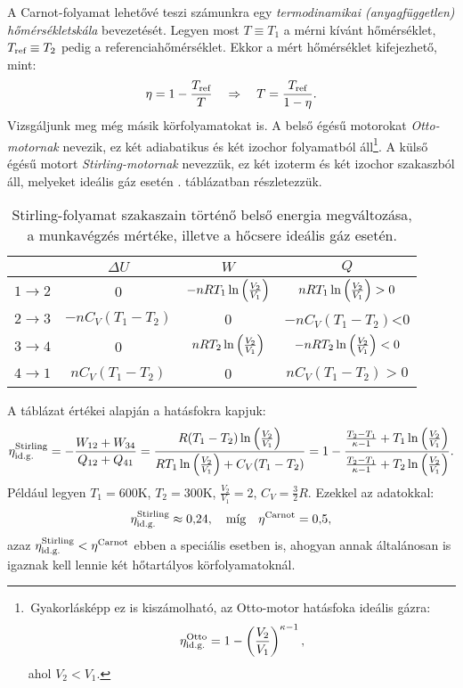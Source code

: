 A Carnot-folyamat lehetővé teszi számunkra egy \emph{termodinamikai (anyagfüggetlen) hőmérsékletskála} bevezetését. Legyen most $T\equiv T_1$ a mérni kívánt hőmérséklet, $T_{\textnormal{ref}}\equiv T_2$ pedig a referenciahőmérséklet. Ekkor a mért hőmérséklet kifejezhető, mint:
\begin{align}
	\eta = 1-\frac{T_{\textnormal{ref}}}{T} \quad\Rightarrow\quad T = \frac{T_{\textnormal{ref}}}{1-\eta}.
\end{align}
Vizsgáljunk meg még másik körfolyamatokat is. A belső égésű motorokat \emph{Otto-motornak} nevezik, ez két adiabatikus és két izochor folyamatból áll\footnote{\,Gyakorlásképp ez is kiszámolható, az Otto-motor hatásfoka ideális gázra:$$\eta_{\textnormal{id.g.}}^{\textnormal{Otto}}=1-\left({\frac{V_2}{V_1}}\right)^{\kappa-1},$$
ahol $V_2<V_1$.}.
A külső égésű motort \emph{Stirling-motornak} nevezzük, ez két izoterm és két izochor szakaszból áll, melyeket ideális gáz esetén . táblázatban részletezzük. 
\begin{table}[h!]
\centering
\begin{tabular}{|c|c|c|c|} \cline{2-4}
\multicolumn{1}{c|}{} & $\Delta U$ & $W$ & $Q$\\ \hline\hline
$1\to 2$ & 0 & $-nRT_1\ln\left({\frac{V_2}{V_1}}\right)$ & $nRT_1\ln\left({\frac{V_2}{V_1}}\right)>0$ \\ \hline
$2\to 3$ & $-nC_V(T_1-T_2)$ & 0 & $-nC_V(T_1-T_2)$<0 \\ \hline
$3\to 4$ & 0 & $nRT_2\ln\left({\frac{V_2}{V_1}}\right)$ & $-nRT_2\ln\left({\frac{V_2}{V_1}}\right)<0$\\ \hline
$4\to 1$ & $nC_V(T_1-T_2)$ & 0 & $nC_V(T_1-T_2)>0$\\ \hline
\end{tabular}
\caption{Stirling-folyamat szakaszain történő belső energia megváltozása, a munkavégzés mértéke, illetve a hőcsere ideális gáz esetén.}
\label{tab:Stirling}
\end{table}
A táblázat értékei alapján a hatásfokra kapjuk:
\begin{align}
	\eta_{\textnormal{id.g.}}^{\textnormal{Stirling}} = -\frac{W_{12}+W_{34}}{Q_{12}+Q_{41}} = \frac{R(T_1-T_2)\ln\left({\frac{V_2}{V_1}}\right)}{RT_1\ln\left({\frac{V_2}{V_1}}\right)+C_V(T_1-T_2)} = 1-\frac{\frac{T_2-T_1}{\kappa-1}+T_1\ln\left({\frac{V_2}{V_1}}\right)}{\frac{T_2-T_1}{\kappa-1}+T_2\ln\left({\frac{V_2}{V_1}}\right)}.
\end{align}
Például legyen $T_1 = 600$K, $T_2 = 300$K, $\frac{V_2}{V_1} = 2$, $C_V = \frac 32 R$. Ezekkel az adatokkal:
\begin{align}
	\eta_{\textnormal{id.g.}}^{\textnormal{Stirling}} \approx 0{,}24,\quad\textnormal{míg}\quad \eta^{\textnormal{Carnot}} = 0{,}5,
\end{align}
azaz $\eta_{\textnormal{id.g.}}^{\textnormal{Stirling}}<\eta^{\textnormal{Carnot}}$ ebben a speciális esetben is, ahogyan annak általánosan is igaznak kell lennie két hőtartályos körfolyamatoknál.